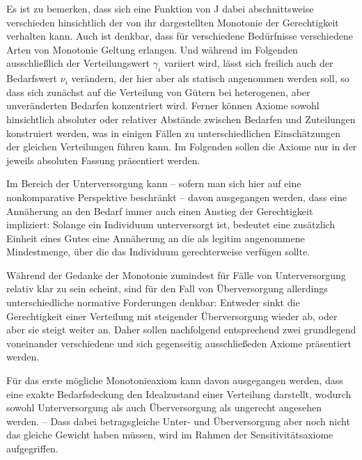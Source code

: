 \documentclass[a4paper]{thesis}
\begin{document}
Es ist zu bemerken, dass sich eine Funktion von J dabei abschnittsweise verschieden hinsichtlich der von ihr dargestellten Monotonie der Gerechtigkeit verhalten kann. Auch ist denkbar, dass für verschiedene Bedürfnisse verschiedene Arten von Monotonie Geltung erlangen. Und während im Folgenden ausschließlich der Verteilungswert $\gamma_i$ variiert wird, lässt sich freilich auch der Bedarfswert $\nu_i$ verändern, der hier aber als statisch angenommen werden soll, so dass sich zunächst auf die Verteilung von Gütern bei heterogenen, aber unveränderten Bedarfen konzentriert wird. Ferner können Axiome sowohl hinsichtlich absoluter oder relativer Abstände zwischen Bedarfen und Zuteilungen konstruiert werden, was in einigen Fällen zu unterschiedlichen Einschätzungen der gleichen Verteilungen führen kann. Im Folgenden sollen die Axiome nur in der jeweils absoluten Fassung präsentiert werden.

Im Bereich der Unterversorgung kann -- sofern man sich hier auf eine nonkomparative Perspektive beschränkt -- davon ausgegangen werden, dass eine Annäherung an den Bedarf immer auch einen Anstieg der Gerechtigkeit impliziert: Solange ein Individuum unterversorgt ist, bedeutet eine zusätzlich Einheit eines Gutes eine Annäherung an die als legitim angenommene Mindestmenge, über die das Individuum gerechterweise verfügen sollte.

Während der Gedanke der Monotonie zumindest für Fälle von Unterversorgung relativ klar zu sein scheint, sind für den Fall von Überversorgung allerdings unterschiedliche normative Forderungen denkbar: Entweder sinkt die Gerechtigkeit einer Verteilung mit steigender Überversorgung wieder ab, oder aber sie steigt weiter an. Daher sollen nachfolgend entsprechend zwei grundlegend voneinander verschiedene und sich gegenseitig ausschließeden Axiome präsentiert werden.

Für das erste mögliche Monotonieaxiom kann davon ausgegangen werden, dass eine exakte Bedarfsdeckung den Idealzustand einer Verteilung darstellt, wodurch sowohl Unterversorgung als auch Überversorgung als ungerecht angesehen werden. -- Dass dabei betragsgleiche Unter- und Überversorgung aber noch nicht das gleiche Gewicht haben müssen, wird im Rahmen der Sensitivitätsaxiome aufgegriffen.
\end{document}
